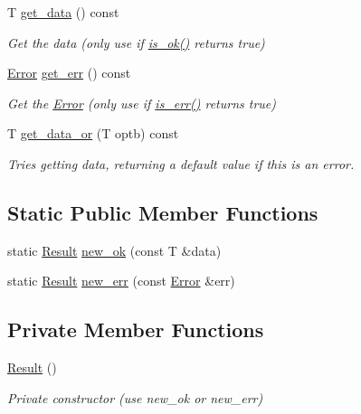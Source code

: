 \begin{DoxyCompactItemize}
\mbox{\label{classnta_1_1Result_a96baacea35085048d694279d5de8c82e}} 
T \hyperlink{classnta_1_1Result_a96baacea35085048d694279d5de8c82e}{get\+\_\+data} () const
\begin{DoxyCompactList}\small\item\em Get the data (only use if \hyperlink{classnta_1_1Result_a61deaa087694eae4fdaece2996fedda0}{is\+\_\+ok()} returns true) \end{DoxyCompactList}\item 
\mbox{\label{classnta_1_1Result_a9ea9717e77d5e9a2371eb3cf9c896bc7}} 
\hyperlink{structnta_1_1Error}{Error} \hyperlink{classnta_1_1Result_a9ea9717e77d5e9a2371eb3cf9c896bc7}{get\+\_\+err} () const
\begin{DoxyCompactList}\small\item\em Get the \hyperlink{structnta_1_1Error}{Error} (only use if \hyperlink{classnta_1_1Result_ab742b047f1e670bc6a374f32c3fd48ea}{is\+\_\+err()} returns true) \end{DoxyCompactList}\item 
\mbox{\label{classnta_1_1Result_ae5fb7648fc0ecfbab99404a97fb27c83}} 
T \hyperlink{classnta_1_1Result_ae5fb7648fc0ecfbab99404a97fb27c83}{get\+\_\+data\+\_\+or} (T optb) const
\begin{DoxyCompactList}\small\item\em Tries getting data, returning a default value if this is an error. \end{DoxyCompactList}\end{DoxyCompactItemize}
\subsection*{Static Public Member Functions}
\begin{DoxyCompactItemize}
\item 
static \hyperlink{classnta_1_1Result}{Result} \hyperlink{classnta_1_1Result_af193a336ab789de94a975c6f0a039e40}{new\+\_\+ok} (const T \&data)
\item 
static \hyperlink{classnta_1_1Result}{Result} \hyperlink{classnta_1_1Result_ad65a9140ae2a03cfb13bd30f848b1aa5}{new\+\_\+err} (const \hyperlink{structnta_1_1Error}{Error} \&err)
\end{DoxyCompactItemize}
\subsection*{Private Member Functions}
\begin{DoxyCompactItemize}
\item 
\mbox{\label{classnta_1_1Result_a6bb10dacafbf334b7209adc5615de44e}} 
\hyperlink{classnta_1_1Result_a6bb10dacafbf334b7209adc5615de44e}{Result} ()
\begin{DoxyCompactList}\small\item\em Private constructor (use new\+\_\+ok or new\+\_\+err) \end{DoxyCompactList}\end{DoxyCompactItemize}
